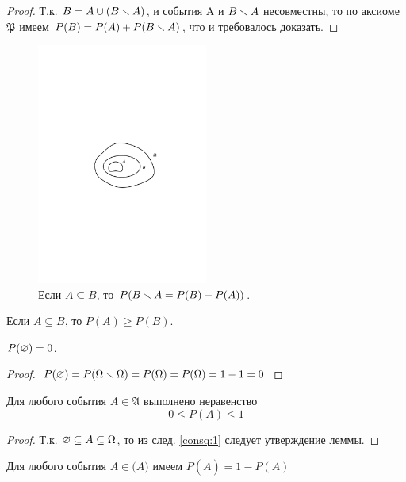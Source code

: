 \begin{proof}
	Т.к. $B=A\cup(B\smallsetminus A)$,  и события A и $B\smallsetminus A $ несовместны, то по аксиоме $\mathfrak{P}$ имеем $P(B)=P(A)+P(B\smallsetminus A)$, что и требовалось доказать.
\end{proof}
\begin{figure}[H]
	\centering
	\includegraphics[width=0.5\textwidth]{pic/pic2.pdf}
	\caption{Если $A\subseteq B$, то $P(B\smallsetminus A=P(B)-P(A))$.}
	\label{pic:2}
\end{figure}

\begin{consq}
	\label{consq:1}
	Если $A\subseteq B$, то $P(A)\geqslant P(B)$. 
\end{consq}

\begin{lemma}
	$P(\varnothing)=0$.
\end{lemma}
\begin{proof}
	$P(\varnothing)=P(\Omega\smallsetminus\Omega)=P(\Omega)=P(\Omega)=1-1=0$
\end{proof}

\begin{lemma}
	Для любого события $A\in\mathfrak{A}$ выполнено неравенство
	\begin{equation*}
		0\leqslant P(A)\leqslant 1
	\end{equation*}
\end{lemma}
\begin{proof}
	Т.к. $\varnothing\subseteq A\subseteq\Omega$, то из след. \ref{consq:1} следует утверждение леммы. 
\end{proof}

\begin{lemma}
	Для любого события $A\in\mathfrak(A)$ имеем $P(\bar{A})=1-P(A)$
\end{lemma}

